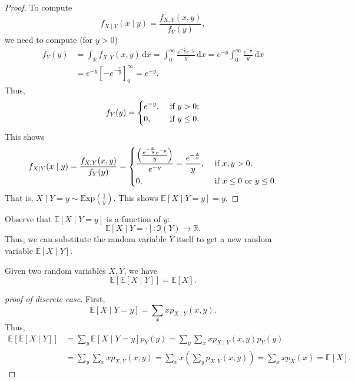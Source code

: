 \begin{proof}
    To compute 
    \[
        f_{X \mid Y} (x \mid y) = \frac{f_{X, Y} (x, y)}{f_Y(y)},
    \]
    we need to compute (for \(y > 0\)) 
    \begin{align*}
        f_Y(y) &= \int _{\mathbb{R}} f_{X, Y} (x, y) \, \mathrm{d} x = \int _0^{\infty} \frac{e^{- \frac{x}{y}} e^{-y}}{y} \, \mathrm{d} x = e^{-y} \int _0^{\infty} \frac{e^{- \frac{x}{y}}}{y} \, \mathrm{d} x \\
        &= e^{-y} \left[ - e^{- \frac{x}{y}} \right]_0^{\infty} = e^{-y}.  
    \end{align*}
    Thus,
    \[
        f_Y(y) = \begin{dcases}
            e^{-y}, &\text{ if } y > 0 ;\\
            0, &\text{ if } y \le 0.
        \end{dcases}
    \]
    This shows 
    \[
        f_{X \mid Y}(x \mid y) = \frac{f_{X, Y} (x, y)}{f_Y(y)} = \begin{dcases}
            \frac{\left( \frac{e^{- \frac{x}{y}} e^{-y}}{y} \right) }{e^{-y}} = \frac{e^{- \frac{x}{y}}}{y}, &\text{ if } x, y > 0 ;\\
            0, &\text{ if }  x \le 0 \text{ or } y \le 0 .
        \end{dcases}
    \]
    That is, \(X \mid Y = y \sim \mathrm{Exp} \left( \frac{1}{y} \right)  \). This shows \(\mathbb{E} [X \mid Y = y] = y\). 
\end{proof}

\begin{remark}
    Observe that \(\mathbb{E} [X \mid Y = y]\) is a function of \(y\): 
    \[
        \mathbb{E} [X \mid Y = \cdot ] : \Im (Y) \to \mathbb{R}.
    \]  
    Thus, we can substitute the random variable \(Y\) itself to get a new random variable \(\mathbb{E} [X \mid Y]\). 
\end{remark}

\begin{proposition}
    Given two random variables \(X, Y\), we have 
    \[
        \mathbb{E} \left[ \mathbb{E} [X \mid Y] \right] = \mathbb{E} [X]. 
    \] 
\end{proposition}

\begin{proof}[proof of discrete case]
    First,
    \[
        \mathbb{E} [X \mid Y = y] = \sum_{x} x p_{X \mid Y} (x, y). 
    \]
    Thus, 
    \begin{align*}
        \mathbb{E} [\mathbb{E} [X \mid Y]] &= \sum_{y} \mathbb{E} [X \mid Y = y] p_Y(y) = \sum_{y} \sum_{x} x p_{X \mid Y} (x, y) p_Y(y) \\
        &= \sum_{y} \sum_{x}x p_{X, Y}(x, y) = \sum_{x} x \left( \sum_{y} p_{X, Y}(x, y)  \right) = \sum_{x} x p_X(x) = \mathbb{E} [X].          
    \end{align*}
\end{proof}

